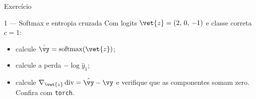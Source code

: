 \documentclass[aspectratio=169, 11pt]{beamer}
\begin{document}
\begin{frame}{Exercício}
  \begin{exbox}{1 — Softmax e entropia cruzada}
    Com logits $\vet{z} = (2,\, 0,\, -1)$ e classe correta $c = 1$:
    \begin{itemize}\setlength{\itemsep}{0.2ex}
      \item[(a)] calcule $\hat{\vy} = \mathrm{softmax}(\vet{z})$;
      \item[(b)] calcule a perda $-\log \hat{y}_1$;
      \item[(c)] calcule $\nabla_{\vet{z}}\,\mathrm{div} = \hat{\vy} - \vy$ e
                 verifique que as componentes somam zero. Confira com \texttt{torch}.
    \end{itemize}
  \end{exbox}
\end{frame}
\end{document}
